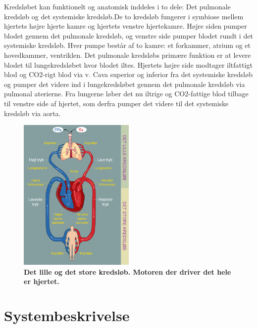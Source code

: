 Kredsløbet kan funktionelt og anatomisk inddeles i to dele: Det pulmonale kredsløb og det systemiske kredsløb.De to kredsløb fungerer i symbiose mellem hjertets højre hjerte kamre og hjertets venstre hjertekamre. Højre siden pumper blodet gennem det pulmonale kredsløb, og venstre side pumper blodet rundt i det systemiske kredsløb. Hver pumpe består af to kamre: et forkammer, atrium og et hovedkammer, ventriklen. Det pulmonale kredsløbs primære funktion er at levere blodet til lungekredsløbet hvor blodet iltes. Hjertets højre side modtager iltfattigt blod og CO2-rigt blod via v. Cava superior og inferior fra det systemiske kredsløb og pumper det videre ind i lungekredsløbet gennem det pulmonale kredsløb via pulmonal aterierne. Fra lungerne løber det nu iltrige og CO2-fattige blod tilbage til venstre side af hjertet, som derfra pumper det videre til det systemiske kredsløb via aorta. \cite{pulmonal}
\begin{figure}[H]
\includegraphics[width =0.5\textwidth , center]{billeder/hjertet}
\caption{\textbf{Det lille og det store kredsløb. Motoren der driver det hele er hjertet. \cite{hjertet}}}
\end{figure}


\chapter{Systembeskrivelse}



